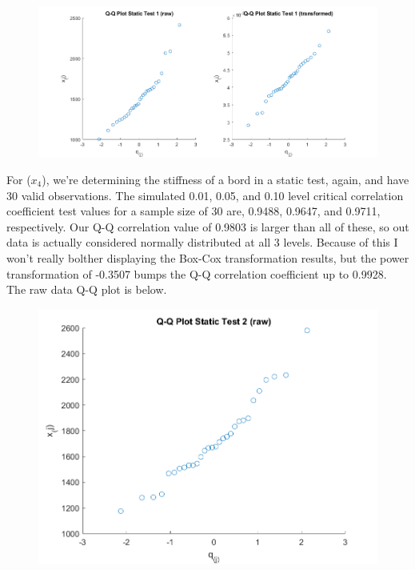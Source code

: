\begin{center}
    \begin{figure}[H]
        \centering
        \includegraphics[scale=0.4]{./matlab/chapter-4/sol4.33.qq.3.png}
    \end{figure}
\end{center}

For ($x_{4}$), we're determining the stiffness of a bord in a static test, again, and have 30 valid observations. The simulated 0.01, 0.05, and 0.10 level critical correlation coefficient test values for a sample size of 30 are, 0.9488, 0.9647, and 0.9711, respectively. Our Q-Q correlation value of 0.9803 is larger than all of these, so out data is actually considered normally distributed at all 3 levels. Because of this I won't really bolther displaying the Box-Cox transformation results, but the power transformation of -0.3507 bumps the Q-Q correlation coefficient up to 0.9928. The raw data Q-Q plot is below.

\begin{center}
    \begin{figure}[H]
        \centering
        \includegraphics[scale=0.6]{./matlab/chapter-4/sol4.33.qq.4.png}
    \end{figure}
\end{center}

